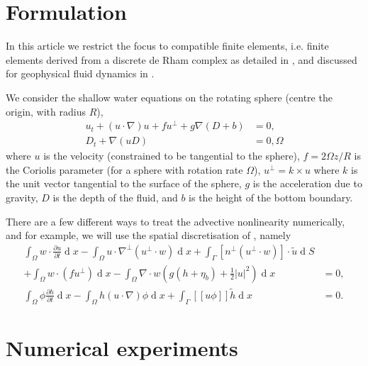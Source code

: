 \documentclass[sn-mathphys]{sn-jnl}%
\theoremstyle{thmstyleone}%
\theoremstyle{thmstyletwo}%
\theoremstyle{thmstylethree}%
\newcommand{\pp}[2]{\frac{\partial #1}{\partial #2}}
\DeclareMathOperator{\diff}{d}
\newcommand{\jump}[1]{[\![ #1]\!]}
\begin{document}
\section{Formulation}\label{sec:formul}

In this article we restrict the focus to compatible finite elements,
i.e. finite elements derived from a discrete de Rham complex as
detailed in \citet{arnold2006finite,arnold2018finite}, and discussed
for geophysical fluid dynamics in
\citet{cotter2012mixed,gibson2019compatible}.

We consider the shallow water equations on the rotating sphere (centre
the origin, with radius $R$),
\begin{align}
  u_t + (u\cdot \nabla)u + fu^{\perp} + g\nabla (D+b) & = 0, \\
  D_t + \nabla(uD) & = 0, \Omega
\end{align}
where $u$ is the velocity (constrained to be tangential to the
sphere), $f=2\Omega z/R$ is the Coriolis parameter (for a sphere with
rotation rate $\Omega$), $u^{\perp}=k\times u$ where $k$ is the unit
vector tangential to the surface of the sphere, $g$ is the
acceleration due to gravity, $D$ is the depth of the fluid, and $b$ is
the height of the bottom boundary.

There are a few different ways to treat the advective nonlinearity
numerically, and for example, we will use the spatial discretisation
of \citet{gibson2019compatible}, namely
\begin{align}
  \int_{\Omega}{w}\cdot\pp{{u}}{t}\diff x
  - \int_\Omega {u}\cdot\nabla^\perp ({u}^\perp\cdot{w})\diff x
  + \int_\Gamma\left[{n}^\perp({u}^\perp\cdot{w})\right]\cdot\widetilde{{u}}\diff S\nonumber\\
  + \int_\Omega{w}\cdot (f{u}^\perp) \diff x
  - \int_{\Omega}\nabla\cdot{w} \left(g(h + \eta_b)
  + \frac{1}{2}|{u}|^2 \right)\diff x &=0,\label{eq:weakVISWE-A}\\
  \int_{\Omega}\phi\pp{h}{t}\diff x - \int_{\Omega}h({u}\cdot\nabla)\phi\diff x
  + \int_{\Gamma} \jump{{u}\phi}\widetilde{h}\diff x
  &= 0.\label{eq:weakVISWE-B}
\end{align}

\section{Numerical experiments}\label{sec:numerics}

\backmatter

\end{document}
